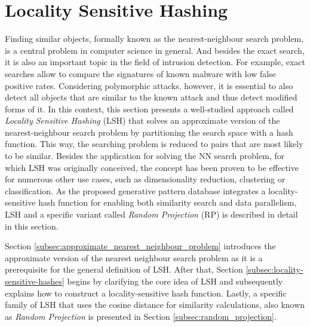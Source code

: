 \section{Locality Sensitive Hashing}
Finding similar objects, formally known as the nearest-neighbour search problem, is a central problem in computer science in general. And besides the exact search, it is also an important topic in the field of intrusion detection. For example, exact searches allow to compare the signatures of known malware with low false positive rates. Considering polymorphic attacks, however, it is essential to also detect all objects that are similar to the known attack and thus detect modified forms of it. In this context, this section presents a well-studied approach called \textit{Locality Sensitive Hashing} (LSH) that solves an approximate version of the nearest-neighbour search problem by partitioning the search space with a hash function. This way, the searching problem is reduced to pairs that are most likely to be similar. Besides the application for solving the NN search problem, for which LSH was originally conceived, the concept has been proven to be effective for numerous other use cases, such as dimensionality reduction, clustering or classification. As the proposed generative pattern database integrates a locality-sensitive hash function for enabling both similarity search and data parallelism, LSH and a specific variant called \textit{Random Projection} (RP) is described in detail in this section.

Section \ref{subsec:approximate_nearest_neighbour_problem} introduces the approximate version of the nearest neighbour search problem as it is a prerequisite for the general definition of LSH. After that, Section \ref{subsec:locality-sensitive-hashes} begins by clarifying the core idea of LSH and subsequently explains how to construct a locality-sensitive hash function. Lastly, a specific family of LSH that uses the cosine distance for similarity calculations, also known as \textit{Random Projection} is presented in Section \ref{subsec:random_projection}.





